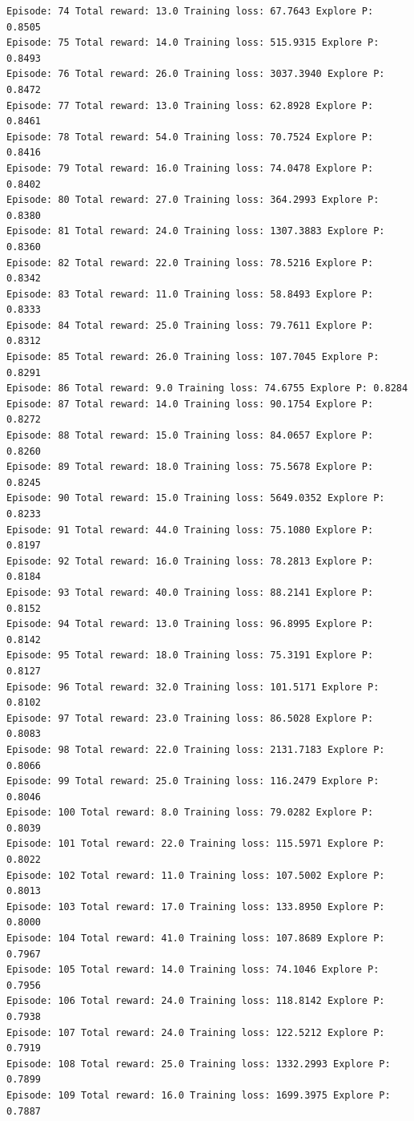 \documentclass[11pt]{article}
\begin{document}
\begin{Verbatim}[commandchars=\\\{\}]
Episode: 74 Total reward: 13.0 Training loss: 67.7643 Explore P: 0.8505
Episode: 75 Total reward: 14.0 Training loss: 515.9315 Explore P: 0.8493
Episode: 76 Total reward: 26.0 Training loss: 3037.3940 Explore P: 0.8472
Episode: 77 Total reward: 13.0 Training loss: 62.8928 Explore P: 0.8461
Episode: 78 Total reward: 54.0 Training loss: 70.7524 Explore P: 0.8416
Episode: 79 Total reward: 16.0 Training loss: 74.0478 Explore P: 0.8402
Episode: 80 Total reward: 27.0 Training loss: 364.2993 Explore P: 0.8380
Episode: 81 Total reward: 24.0 Training loss: 1307.3883 Explore P: 0.8360
Episode: 82 Total reward: 22.0 Training loss: 78.5216 Explore P: 0.8342
Episode: 83 Total reward: 11.0 Training loss: 58.8493 Explore P: 0.8333
Episode: 84 Total reward: 25.0 Training loss: 79.7611 Explore P: 0.8312
Episode: 85 Total reward: 26.0 Training loss: 107.7045 Explore P: 0.8291
Episode: 86 Total reward: 9.0 Training loss: 74.6755 Explore P: 0.8284
Episode: 87 Total reward: 14.0 Training loss: 90.1754 Explore P: 0.8272
Episode: 88 Total reward: 15.0 Training loss: 84.0657 Explore P: 0.8260
Episode: 89 Total reward: 18.0 Training loss: 75.5678 Explore P: 0.8245
Episode: 90 Total reward: 15.0 Training loss: 5649.0352 Explore P: 0.8233
Episode: 91 Total reward: 44.0 Training loss: 75.1080 Explore P: 0.8197
Episode: 92 Total reward: 16.0 Training loss: 78.2813 Explore P: 0.8184
Episode: 93 Total reward: 40.0 Training loss: 88.2141 Explore P: 0.8152
Episode: 94 Total reward: 13.0 Training loss: 96.8995 Explore P: 0.8142
Episode: 95 Total reward: 18.0 Training loss: 75.3191 Explore P: 0.8127
Episode: 96 Total reward: 32.0 Training loss: 101.5171 Explore P: 0.8102
Episode: 97 Total reward: 23.0 Training loss: 86.5028 Explore P: 0.8083
Episode: 98 Total reward: 22.0 Training loss: 2131.7183 Explore P: 0.8066
Episode: 99 Total reward: 25.0 Training loss: 116.2479 Explore P: 0.8046
Episode: 100 Total reward: 8.0 Training loss: 79.0282 Explore P: 0.8039
Episode: 101 Total reward: 22.0 Training loss: 115.5971 Explore P: 0.8022
Episode: 102 Total reward: 11.0 Training loss: 107.5002 Explore P: 0.8013
Episode: 103 Total reward: 17.0 Training loss: 133.8950 Explore P: 0.8000
Episode: 104 Total reward: 41.0 Training loss: 107.8689 Explore P: 0.7967
Episode: 105 Total reward: 14.0 Training loss: 74.1046 Explore P: 0.7956
Episode: 106 Total reward: 24.0 Training loss: 118.8142 Explore P: 0.7938
Episode: 107 Total reward: 24.0 Training loss: 122.5212 Explore P: 0.7919
Episode: 108 Total reward: 25.0 Training loss: 1332.2993 Explore P: 0.7899
Episode: 109 Total reward: 16.0 Training loss: 1699.3975 Explore P: 0.7887

\end{Verbatim}
\end{document}
